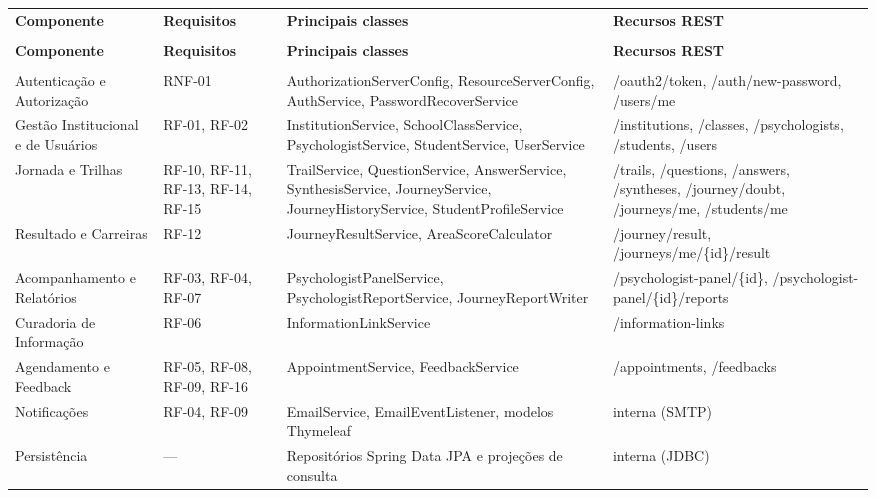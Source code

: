 {\ABNTEXfontereduzida
\renewcommand{\arraystretch}{1.25}
\begin{xltabular}{\textwidth}{|>{\raggedright\arraybackslash}p{3.4cm}|>{\raggedright\arraybackslash}p{2.2cm}|>{\raggedright\arraybackslash}X|>{\raggedright\arraybackslash}p{4.5cm}|}
 \\[0.3em]
\hline
\textbf{Componente} & \textbf{Requisitos} & \textbf{Principais classes} & \textbf{Recursos REST} \\
\hline
\endfirsthead
{} \\
\hline
\textbf{Componente} & \textbf{Requisitos} & \textbf{Principais classes} & \textbf{Recursos REST} \\
\hline
\endhead
{} \\
\endfoot
\endlastfoot
Autenticação e Autorização & RNF-01 & AuthorizationServerConfig, ResourceServerConfig, AuthService, PasswordRecoverService & /oauth2/token, /auth/new-password, /users/me \\
\hline
Gestão Institucional e de Usuários & RF-01, RF-02 & InstitutionService, SchoolClassService, PsychologistService, StudentService, UserService & /institutions, /classes, /psychologists, /students, /users \\
\hline
Jornada e Trilhas & RF-10, RF-11, RF-13, RF-14, RF-15 & TrailService, QuestionService, AnswerService, SynthesisService, JourneyService, JourneyHistoryService, StudentProfileService & /trails, /questions, /answers, /syntheses, /journey/doubt, /journeys/me, /students/me \\
\hline
Resultado e Carreiras & RF-12 & JourneyResultService, AreaScoreCalculator & /journey/result, /journeys/me/\{id\}/result \\
\hline
Acompanhamento e Relatórios & RF-03, RF-04, RF-07 & PsychologistPanelService, PsychologistReportService, JourneyReportWriter & /psychologist-panel/\{id\}, /psychologist-panel/\{id\}/reports \\
\hline
Curadoria de Informação & RF-06 & InformationLinkService & /information-links \\
\hline
Agendamento e Feedback & RF-05, RF-08, RF-09, RF-16 & AppointmentService, FeedbackService & /appointments, /feedbacks \\
\hline
Notificações & RF-04, RF-09 & EmailService, EmailEventListener, modelos Thymeleaf & interna (SMTP) \\
\hline
Persistência & — & Repositórios Spring Data JPA e projeções de consulta & interna (JDBC) \\
\hline
\end{xltabular}
}

